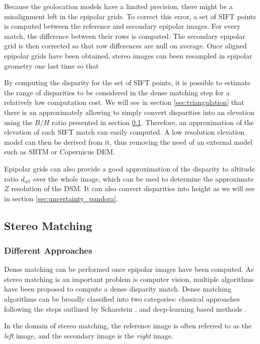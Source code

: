 Because the geolocation models have a limited precision, there might be a misalignment left in the epipolar grids. To correct this error, a set of SIFT points \cite{lowe_distinctive_2004} is computed between the reference and secondary epipolar images. For every match, the difference between their rows is computed. The secondary epipolar grid is then corrected so that row differences are null on average. Once aligned epipolar grids have been obtained, stereo images can been resampled in epipolar geometry one last time so that 

\begin{remark}
    By computing the disparity for the set of SIFT points, it is possible to estimate the range of disparities to be considered in the dense matching step for a relatively low computation cost. We will see in section \ref{sec:triangulation} that there is an approximately allowing to simply convert disparities into an elevation using the $B/H$ ratio presented in section \ref{sec:stereo_matching}. Therefore, an approximation of the elevation of each SIFT match can easily computed. A low resolution elevation model can then be derived from it, thus removing the need of an external model such as SRTM or Copernicus DEM.
\end{remark} 

Epipolar grids can also provide a good approximation of the disparity to altitude ratio $d_{alt}$ over the whole image, which can be used to determine the approximate $Z$ resolution of the DSM. It can also convert disparities into height as we will see in section \ref{sec:uncertainty_pandora}. 

\subsection{Stereo Matching}\label{sec:stereo_matching}
\subsubsection{Different Approaches}
Dense matching can be performed once epipolar images have been computed. As stereo matching is an important problem is computer vision, multiple algorithms have been proposed to compute a dense disparity match. Dense matching algorithms can be broadly classified into two categories: classical approaches following the steps outlined by Scharstein \etal \cite{scharstein_taxonomy_2001}, and deep-learning based methods \cite{laga_survey_2022}.
\begin{remark}
	In the domain of stereo matching, the reference image is often referred to as the \textit{left} image, and the secondary image is the \textit{right} image.
\end{remark}

